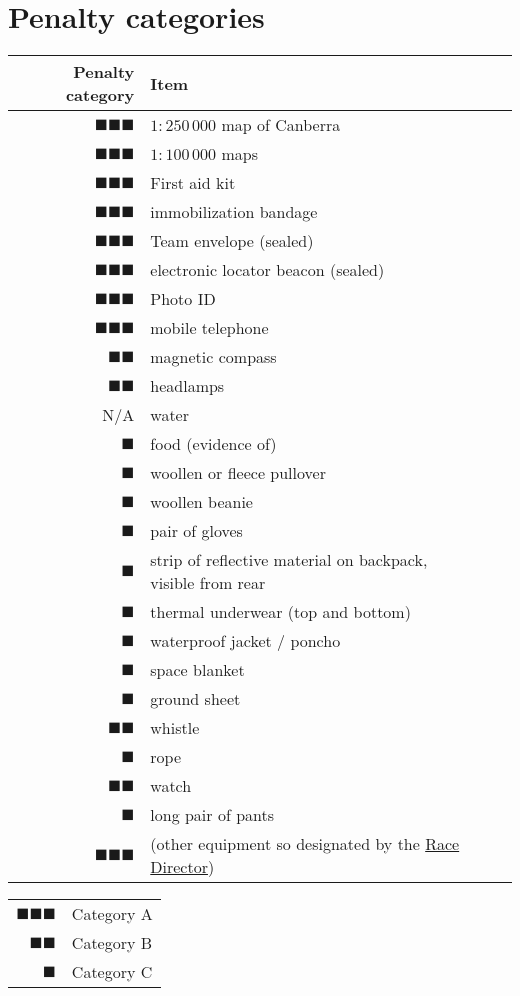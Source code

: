 \documentclass[12pt]{report}
\newcommand{\hyplink}[1]{\hyperlink{#1}{{#1}}}
\newcommand{\RaceDirector}{\hyplink{Race Director}}
\begin{document}
  \vspace{12pt}
  \chapter{Penalty categories}\label{appendix:penalties}
  \newcommand{\A}{$\blacksquare\blacksquare\blacksquare$}
  \newcommand{\B}{$\blacksquare\blacksquare$}
  \newcommand{\C}{$\blacksquare$}
  \begin{table} 
  \begin{longtable}
    {rlrr}
    \textbf{Penalty category} & \textbf{Item}& &\\
    \hline
    \A& $1:250\,000$ map of Canberra \\
    \A&$1:100\,000$ maps \\
    \A&First aid kit\\
    \A& immobilization bandage\\
    \A&Team envelope (sealed) \\
    \A&electronic locator beacon (sealed)\\
    \A&Photo ID  \\
    \A&mobile telephone  \\
    \B&magnetic compass  \\
    \B&headlamps \\
   N/A& water  \\
    \C&food (evidence of)  \\
    \C&woollen or fleece pullover \\
    \C&woollen beanie \\
    \C&pair of gloves \\
    \C&strip of reflective material on backpack, visible from rear \\
    \C&thermal underwear (top and bottom) \\
    \C&waterproof jacket / poncho \\
    \C&space blanket \\
    \C&ground sheet \\
    \B&whistle \\
    \C&rope \\
    \B&watch \\
    \C&long pair of pants\\
    \A&(other equipment so designated by the \RaceDirector)
  \end{longtable}\vspace{24pt}
  \begin{center}
  \begin{tabular}
    {rl}
    \A & Category A\\
    \B & Category B\\
    \C & Category C
  \end{tabular}\end{center}
  \end{table}
\end{document}
